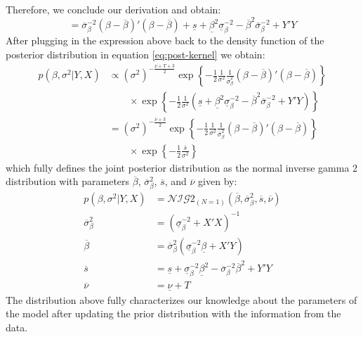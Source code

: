\documentclass[
  letterpaper,
  DIV=11,
  numbers=noendperiod]{scrreprt}
\begin{document}
Therefore, we conclude our derivation and obtain: \begin{equation}
= \overline{\sigma}_{\beta}^{-2}\left(\beta-\overline{\beta}\right)'\left(\beta-\overline{\beta}\right) + \underline{s} + \underline{\beta}^2 \underline{\sigma}_{\beta}^{-2} - \overline{\beta}^2 \overline{\sigma}_{\beta}^{-2}  + Y'Y 
\end{equation} After plugging in the expression above back to the
density function of the posterior distribution in equation
\eqref{eq:post-kernel} we obtain: \begin{align}
p\left( \beta,\sigma^2|Y,X \right) &\propto 
\left( \sigma^2 \right)^{-\frac{\underline{\nu}+T+3}{2}}\exp\left\{ -\frac{1}{2}\frac{1}{\sigma^2} 
\frac{1}{\overline{\sigma}_{\beta}^{2}}\left(\beta-\overline{\beta}\right)'\left(\beta-\overline{\beta}\right) \right\}\\ 
&\qquad\times \exp\left\{ -\frac{1}{2}\frac{1}{\sigma^2} \left( \underline{s} + \underline{\beta}^2 \underline{\sigma}_{\beta}^{-2} - \overline{\beta}^2 \overline{\sigma}_{\beta}^{-2}  + Y'Y  \right)  \right\}\\
&=  \left(\sigma^2\right)^{-\frac{\overline{\nu}+3}{2}}\exp\left\{ -\frac{1}{2}\frac{1}{\sigma^2}\frac{1}{\overline{\sigma}_{\beta}^2}\left(\beta-\overline{\beta}\right)'\left(\beta-\overline{\beta}\right) \right\}\\
&\qquad\times\exp\left\{ -\frac{1}{2}\frac{\overline{s}}{\sigma^2} \right\}
\end{align} which fully defines the joint posterior distribution as the
normal inverse gamma 2 distribution with parameters
\(\overline{\beta}\), \(\overline{\sigma}_{\beta}^2\), \(\overline{s}\),
and \(\overline{\nu}\) given by: \begin{align*} 
p\left( \beta,\sigma^2|Y,X \right) &= \mathcal{NIG}2_{(N=1)}\left(\overline{\beta}, \overline{\sigma}_{\beta}^2, \overline{s},\overline{\nu} \right)\\[1ex]
\overline{\sigma}_{\beta}^2 &= \left( \underline{\sigma}_{\beta}^{-2} + X'X \right)^{-1} \\
\overline{\beta} &= \overline{\sigma}_{\beta}^2\left( \underline{\sigma}_{\beta}^{-2}\underline{\beta} + X'Y \right) \\ 
\overline{s} &= \underline{s} + \underline{\sigma}_{\beta}^{-2}\underline{\beta}^2 - \overline{\sigma}_{\beta}^{-2}\overline{\beta}^2 + Y'Y \\
\overline{\nu} &= \underline{\nu} + T
\end{align*} The distribution above fully characterizes our knowledge
about the parameters of the model after updating the prior distribution
with the information from the data.
\end{document}
